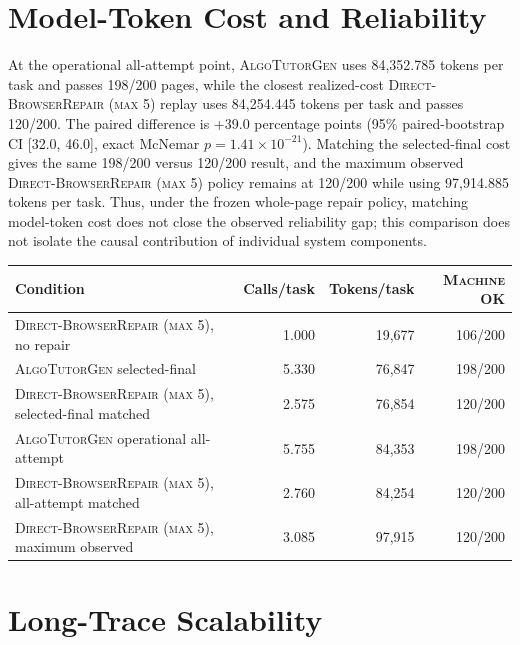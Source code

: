 \documentclass[letterpaper]{article}
\newcommand{\system}{\textsc{AlgoTutorGen}}
\newcommand{\machineok}{\textsc{Machine OK}}
\newcommand{\dbr}{\textsc{Direct-BrowserRepair (max 5)}}
\begin{document}
\section{Model-Token Cost and Reliability}

\noindent\begin{minipage}{\columnwidth}
At the operational all-attempt point, \system{} uses 84,352.785 tokens
per task and passes 198/200 pages, while the closest realized-cost
\dbr{} replay uses 84,254.445 tokens per task and passes 120/200. The
paired difference is +39.0 percentage points (95\% paired-bootstrap CI
[32.0, 46.0], exact McNemar $p=1.41\times10^{-21}$). Matching the
selected-final cost gives the same 198/200 versus 120/200 result, and
the maximum observed \dbr{} policy remains at 120/200 while using
97,914.885 tokens per task. Thus, under the frozen whole-page repair
policy, matching model-token cost does not close the observed
reliability gap; this comparison does not isolate the causal
contribution of individual system components.

\begin{center}
\scriptsize
\setlength{\tabcolsep}{2.5pt}
\begin{tabular}{@{}p{}rrr@{}}
\toprule
Condition & Calls/task & Tokens/task & \machineok{} \\
\midrule
\dbr{}, no repair & 1.000 & 19,677 & 106/200 \\
\system{} selected-final & 5.330 & 76,847 & 198/200 \\
\dbr{}, selected-final matched & 2.575 & 76,854 & 120/200 \\
\system{} operational all-attempt & 5.755 & 84,353 & 198/200 \\
\dbr{}, all-attempt matched & 2.760 & 84,254 & 120/200 \\
\dbr{}, maximum observed & 3.085 & 97,915 & 120/200 \\
\bottomrule
\end{tabular}
\label{tab:generation-cost}
\label{tab:total-token-cost-reliability}
\end{center}

\end{minipage}

\section{Long-Trace Scalability}
\end{document}
